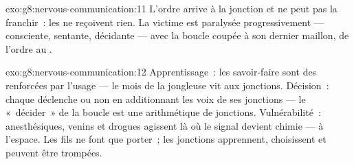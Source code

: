 \begin{solution}{exo:g8:nervous-communication:11}
L'ordre arrive à la jonction et ne peut pas la franchir~: les
 ne reçoivent rien. La victime est paralysée
progressivement --- consciente, sentante, décidante --- avec la
boucle coupée à son dernier maillon, de l'ordre au .
\end{solution}

\begin{solution}{exo:g8:nervous-communication:12}
Apprentissage~: les savoir-faire sont des  renforcées par
l'usage --- le mois de la jongleuse vit aux jonctions. Décision~:
chaque  déclenche ou non en additionnant les voix de ses
jonctions --- le «~décider~» de la boucle est une arithmétique de
jonctions. Vulnérabilité~: anesthésiques, venins et drogues agissent
là où le signal devient chimie --- à l'espace. Les fils ne font que
porter~; les jonctions apprennent, choisissent et peuvent être
trompées.
\end{solution}

